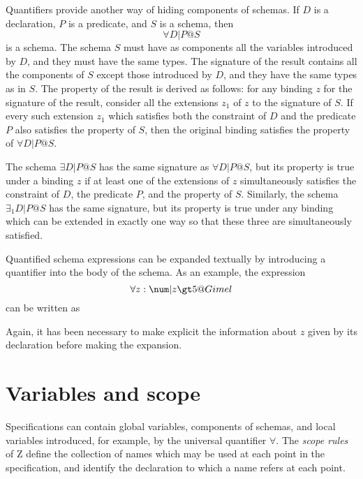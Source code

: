 Quantifiers provide another way of hiding components of schemas. If
$D$ is a declaration, $P$ is a predicate, and $S$ is a schema,
then
\[ \forall D | P @ S \] 
is a schema. The schema $S$ must have as components all the
variables introduced by $D$, and they must have the same types. The
signature of the result contains all the components of $S$ except
those introduced by $D$, and they have the same types as in $S$.
The property of the result is derived as follows: for any binding $z$
for the signature of the result, consider all the extensions $z_1$ of
$z$ to the signature of $S$.  If every such
extension $z_1$ which satisfies both the constraint of $D$ and the
predicate $P$ also satisfies the property of $S$, then the original
binding satisfies the property of $\forall D | P @ S$.

The schema $\exists D | P @ S$ has the same signature as $\forall D | P @ S$, but
its property is true under a binding $z$ if at least one of the
extensions of $z$ simultaneously satisfies the constraint of $D$, the
predicate $P$, and the property of $S$. Similarly, the schema
$\exists_1 D | P @ S$ has
the same signature, but its property is true under any binding which
can be extended in exactly one way so that these three are
simultaneously satisfied.

Quantified schema expressions can be expanded textually by introducing
a quantifier into the body of the schema. As an example, the expression
\[ \forall z: \num | z \gt 5 @ Gimel \]
can be written as
Again, it has been necessary to make explicit the information about
$z$ given by its declaration before making the expansion.

\section{Variables and scope}\label{s:scope}

Specifications can contain global variables, components
of schemas, and local variables
introduced, for example, by the universal quantifier $\forall$.
The {\em scope rules\/}%
of Z define the collection of names which may
be used at each point in the specification, and identify the
declaration to which a name refers at each point.

